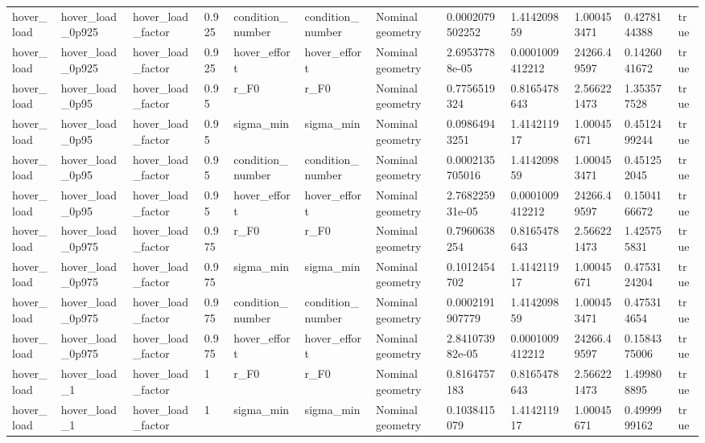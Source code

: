 \begin{tabular}{@{}llllllllllll@{}}
hover\_load & hover\_load\_0p925 & hover\_load\_factor & 0.925 & condition\_number & condition\_number & Nominal geometry & 0.0002079502252 & 1.414209859 & 1.000453471 & 0.4278144388 & true \\
hover\_load & hover\_load\_0p925 & hover\_load\_factor & 0.925 & hover\_effort & hover\_effort & Nominal geometry & 2.69537788e-05 & 0.0001009412212 & 24266.49597 & 0.1426041672 & true \\
hover\_load & hover\_load\_0p95 & hover\_load\_factor & 0.95 & r\_F0 & r\_F0 & Nominal geometry & 0.7756519324 & 0.8165478643 & 2.566221473 & 1.353577528 & true \\
hover\_load & hover\_load\_0p95 & hover\_load\_factor & 0.95 & sigma\_min & sigma\_min & Nominal geometry & 0.09864943251 & 1.414211917 & 1.00045671 & 0.4512499244 & true \\
hover\_load & hover\_load\_0p95 & hover\_load\_factor & 0.95 & condition\_number & condition\_number & Nominal geometry & 0.0002135705016 & 1.414209859 & 1.000453471 & 0.451252045 & true \\
hover\_load & hover\_load\_0p95 & hover\_load\_factor & 0.95 & hover\_effort & hover\_effort & Nominal geometry & 2.768225931e-05 & 0.0001009412212 & 24266.49597 & 0.1504166672 & true \\
hover\_load & hover\_load\_0p975 & hover\_load\_factor & 0.975 & r\_F0 & r\_F0 & Nominal geometry & 0.7960638254 & 0.8165478643 & 2.566221473 & 1.425755831 & true \\
hover\_load & hover\_load\_0p975 & hover\_load\_factor & 0.975 & sigma\_min & sigma\_min & Nominal geometry & 0.1012454702 & 1.414211917 & 1.00045671 & 0.4753124204 & true \\
hover\_load & hover\_load\_0p975 & hover\_load\_factor & 0.975 & condition\_number & condition\_number & Nominal geometry & 0.0002191907779 & 1.414209859 & 1.000453471 & 0.475314654 & true \\
hover\_load & hover\_load\_0p975 & hover\_load\_factor & 0.975 & hover\_effort & hover\_effort & Nominal geometry & 2.841073982e-05 & 0.0001009412212 & 24266.49597 & 0.1584375006 & true \\
hover\_load & hover\_load\_1 & hover\_load\_factor & 1 & r\_F0 & r\_F0 & Nominal geometry & 0.8164757183 & 0.8165478643 & 2.566221473 & 1.499808895 & true \\
hover\_load & hover\_load\_1 & hover\_load\_factor & 1 & sigma\_min & sigma\_min & Nominal geometry & 0.1038415079 & 1.414211917 & 1.00045671 & 0.4999999162 & true \\

\end{tabular}
